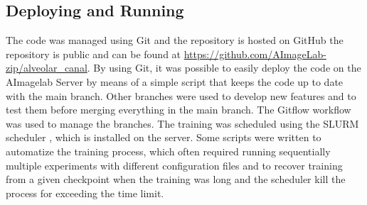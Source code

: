 \subsection{Deploying and Running}
The code was managed using Git and the repository is hosted on GitHub the
repository is public and can be found at
\url{https://github.com/AImageLab-zip/alveolar\_canal}. By using Git, it was
possible to easily deploy the code on the AImagelab Server by means of a simple
script that keeps the code up to date with the main branch. Other branches were
used to develop new features and to test them before merging everything in the
main branch. The Gitflow workflow was used to manage the branches. The training
was scheduled using the SLURM scheduler \cite{yoo2003slurm}, which is installed
on the server. Some scripts were written to automatize the training process,
which often required running sequentially multiple experiments with different
configuration files and to recover training from a given checkpoint when the
training was long and the scheduler kill the process for exceeding the time
limit.

